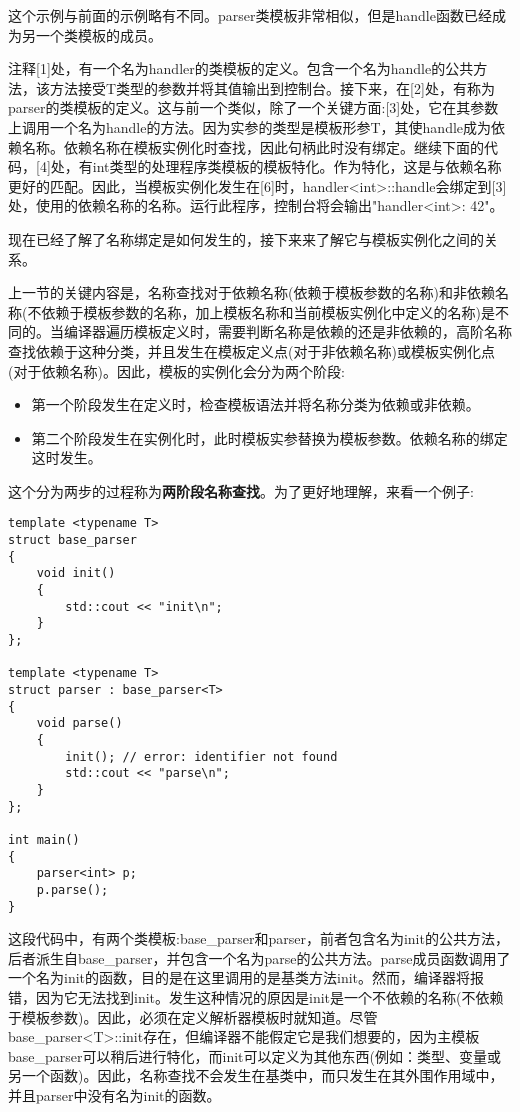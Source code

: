 这个示例与前面的示例略有不同。parser类模板非常相似，但是handle函数已经成为另一个类模板的成员。

注释[1]处，有一个名为handler的类模板的定义。包含一个名为handle的公共方法，该方法接受T类型的参数并将其值输出到控制台。接下来，在[2]处，有称为parser的类模板的定义。这与前一个类似，除了一个关键方面:[3]处，它在其参数上调用一个名为handle的方法。因为实参的类型是模板形参T，其使handle成为依赖名称。依赖名称在模板实例化时查找，因此句柄此时没有绑定。继续下面的代码，[4]处，有int类型的处理程序类模板的模板特化。作为特化，这是与依赖名称更好的匹配。因此，当模板实例化发生在[6]时，handler<int>::handle会绑定到[3]处，使用的依赖名称的名称。运行此程序，控制台将会输出"handler<int>: 42"。

现在已经了解了名称绑定是如何发生的，接下来来了解它与模板实例化之间的关系。


上一节的关键内容是，名称查找对于依赖名称(依赖于模板参数的名称)和非依赖名称(不依赖于模板参数的名称，加上模板名称和当前模板实例化中定义的名称)是不同的。当编译器遍历模板定义时，需要判断名称是依赖的还是非依赖的，高阶名称查找依赖于这种分类，并且发生在模板定义点(对于非依赖名称)或模板实例化点(对于依赖名称)。因此，模板的实例化会分为两个阶段:

\begin{itemize}
\item
第一个阶段发生在定义时，检查模板语法并将名称分类为依赖或非依赖。

\item
第二个阶段发生在实例化时，此时模板实参替换为模板参数。依赖名称的绑定这时发生。
\end{itemize}

这个分为两步的过程称为\textbf{两阶段名称查找}。为了更好地理解，来看一个例子:

\begin{lstlisting}[style=styleCXX]
template <typename T>
struct base_parser
{
	void init()
	{
		std::cout << "init\n";
	}
};

template <typename T>
struct parser : base_parser<T>
{
	void parse()
	{
		init(); // error: identifier not found
		std::cout << "parse\n";
	}
};

int main()
{
	parser<int> p;
	p.parse();
}
\end{lstlisting}

这段代码中，有两个类模板:base\_parser和parser，前者包含名为init的公共方法，后者派生自base\_parser，并包含一个名为parse的公共方法。parse成员函数调用了一个名为init的函数，目的是在这里调用的是基类方法init。然而，编译器将报错，因为它无法找到init。发生这种情况的原因是init是一个不依赖的名称(不依赖于模板参数)。因此，必须在定义解析器模板时就知道。尽管base\_parser<T>::init存在，但编译器不能假定它是我们想要的，因为主模板base\_parser可以稍后进行特化，而init可以定义为其他东西(例如：类型、变量或另一个函数)。因此，名称查找不会发生在基类中，而只发生在其外围作用域中，并且parser中没有名为init的函数。
 
